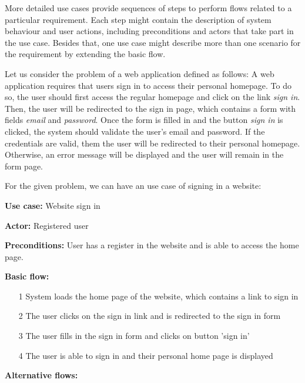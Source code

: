 
More detailed use cases provide sequences of steps to perform flows related to a particular requirement. Each step might contain the description of system behaviour and user actions, including preconditions and actors that take part in the use case. Besides that, one use case might describe more than one scenario for the requirement by extending the basic flow. 


Let us consider the problem of a web application defined as follows: A web application requires that users sign in to access their personal homepage. To do so, the user should first access the regular homepage and click on the link \textit{sign in}. Then, the user will be redirected to the sign in page, which contains a form with fields \textit{email} and \textit{password}. Once the form is filled in and the button \textit{sign in} is clicked, the system should validate the user's email and password. If the credentials are valid, them the user will be redirected to their personal homepage. Otherwise, an error message will be displayed and the user will remain in the form page.

For the given problem, we can have an use case of signing in a website:

\textbf{Use case:} Website sign in

\textbf{Actor:} Registered user

\textbf{Preconditions:} User has a register in the website and is able to access the home page. 

\textbf{Basic flow:}

\begin{itemize}

\item[1] System loads the home page of the website, which contains a link to sign in

\item[2] The user clicks on the sign in link and is redirected to the sign in form

\item[3] The user fills in the sign in form and clicks on button 'sign in'

\item[4] The user is able to sign in and their personal home page is displayed
\end{itemize}

\textbf{Alternative flows:}

